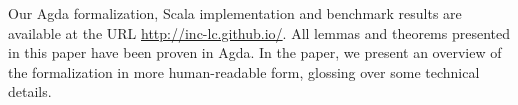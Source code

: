 
Our Agda formalization, Scala implementation and benchmark
results are available at the URL
\url{http://inc-lc.github.io/}.
All lemmas and theorems presented
in this paper have been proven in Agda.
In the paper, we present an overview of
the formalization in more human-readable form, glossing over some
technical details.

